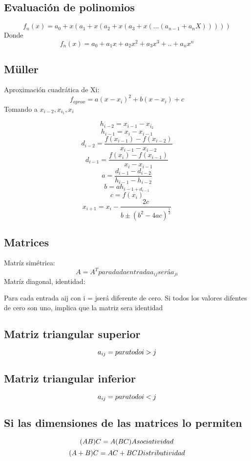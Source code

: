     
  \subsection{Evaluación de polinomios}
  
  $$
  	f_n(x)  = a_0 +  x(a_1 + x(a_2+x(a_3 + x(... (a_{n-1} +a_n X)))))
   $$
   Donde 
   $$f_n(x) = a_0 + a_1x + a_2x^2 + a_3x^3 + .. + a_nx^n$$

   \subsection{Müller}
   		Aproximación cuadrática de Xi:
        $$
         f_{aprox} = a(x-x_i)^2 + b(x-x_i) + c
        $$
        Tomando a $ x_{i-2}, x_{i_1} , x_i$
        
        $$h_{i-2} = x_{i-1} - x_{i_2} $$
        $$h_{i-1} = x_i -x_{i-1}$$
        $$d_{i-2} = \frac{f(x_{i-1})-f(x_{i-2})}{x_{i-1}- x_{i-2}}$$
        $$d_{i-1} = \frac{f(x_{i})-f(x_{i-1})}{x_{i}- x_{i-1}}$$
        $$ a = \frac{d_{i-1}-d_{i-2}}{h_{i-1}-h_{i-2}}$$
        $$ b = ah_{i-1 + d_{i-1}}$$
        $$ c = f(x_i)$$
        $$ x_{i+1} = x_i - \frac{2c}{b \pm (b^2 -4ac)^{\frac{1}{2}} }$$
        
    \subsection{Matrices}
    Matríz simétrica: 
    $$
    	A = A^{T}
        para dada entrada a_{i j} será a_{j i} 
    $$
     Matríz diagonal, identidad: 
  
    	Para \space cada \space entrada \space a{ij} \space con \space i \space =  \space j\space será \space diferente \space de \space cero. Si todos los valores difentes de cero son uno, implica que la matriz sera identidad
        
    \subsection{Matriz triangular superior}
		$$a_{ij} =  \space para \space todo \space i>j $$
	\subsection{Matriz triangular inferior}
    	$$a_{ij} =  \space para \space todo \space i<j $$
        
     \subsection{Si las dimensiones de las matrices lo permiten}   
        $$(AB)C = A(BC) \space Asociatividad$$
        $$(A+B)C = AC + BC  \space Distributividad$$
      
